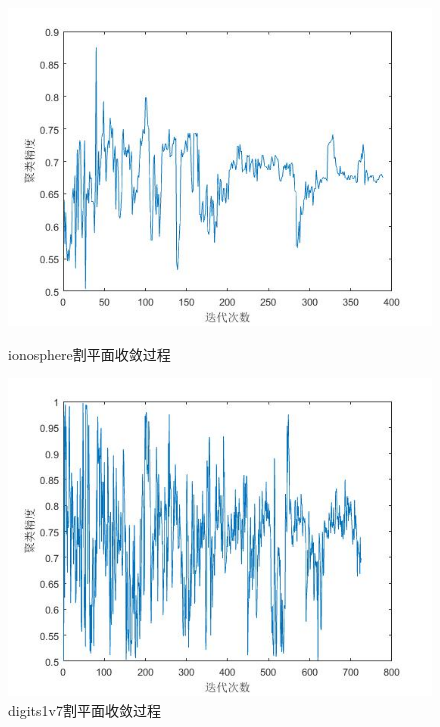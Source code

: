 \begin{figure}[H]
  \centering
  \begin{minipage}[t]{0.45\linewidth}
\includegraphics[width=\textwidth]{figure/ionosphere_acc.jpg}
  \caption{ionosphere割平面收敛过程}
  \label{fig:ionosphere-gpm}
  \end{minipage}
  \begin{minipage}[t]{0.45\linewidth}
\includegraphics[width=\textwidth]{figure/digits1v7_acc.jpg}
  \caption{digits1v7割平面收敛过程}
  \label{fig:digits1v7-gpm}
  \end{minipage}
  \begin{minipage}[t]{0.45\linewidth}

\end{minipage}
\end{figure}
